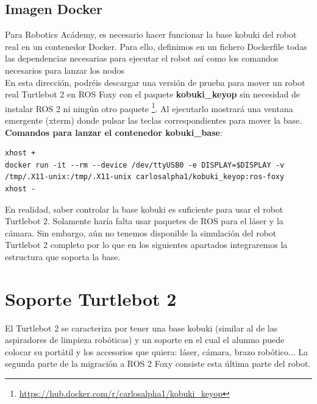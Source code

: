 \subsection{Imagen Docker}
\label{sec:kobuki_base_docker}

Para Robotics Acádemy, es necesario hacer funcionar la base kobuki del robot real en un contenedor Docker. Para ello, definimos en un fichero Dockerfile todas las dependencias necesarias para ejecutar el robot así como los comandos necesarios para lanzar los nodos\\

En esta dirección, podréis descargar una versión de prueba para mover un robot real Turtlebot 2 en ROS Foxy con el paquete \textbf{kobuki\_keyop} sin necesidad de instalar ROS 2 ni ningún otro paquete \footnote{\url{https://hub.docker.com/r/carlosalpha1/kobuki_keyop}}. Al ejecutarlo mostrará una ventana emergente (xterm) donde pulsar las teclas correspondientes para mover la base.\\

\textbf{Comandos para lanzar el contenedor kobuki\_base}:\\
\begin{lstlisting}
xhost +
docker run -it --rm --device /dev/ttyUSB0 -e DISPLAY=$DISPLAY -v /tmp/.X11-unix:/tmp/.X11-unix carlosalpha1/kobuki_keyop:ros-foxy
xhost -
\end{lstlisting}

En realidad, saber controlar la base kobuki es suficiente para usar el robot Turtlebot 2. Solamente haría falta usar paquetes de ROS para el láser y la cámara. Sin embargo, aún no tenemos disponible la simulación del robot Turtlebot 2 completo por lo que en los siguientes apartados integraremos la estructura que soporta la base.



\section{Soporte Turtlebot 2}
\label{sec:soporte_turtlebot2}

El Turtlebot 2 se caracteriza por tener una base kobuki (similar al de las aspiradores de limpieza robóticas) y un soporte en el cual el alumno puede colocar su portátil y los accesorios que quiera: láser, cámara, brazo robótico... La segunda parte de la migración a ROS 2 Foxy consiste esta última parte del robot.\\

